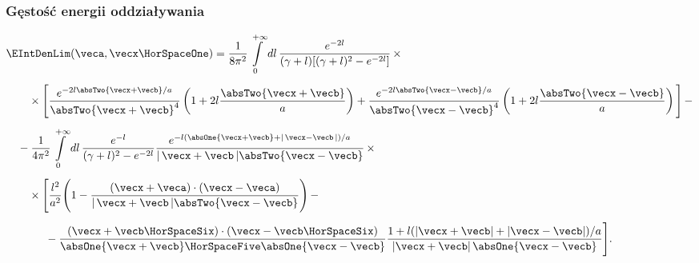 \documentclass[10pt,t]{beamer}
\begin{document}
\begin{frame}
  \frametitle{Gęstość energii oddziaływania}

  \vspace{-2em}


  \begin{equation}
    \label{eq:Pole-skalarne-ETC-11}
    \begin{split}
      &\EIntDenLim( \veca, \vecx \HorSpaceOne ) =
        \frac{ 1 }{ 8\pi^{ 2 } }
        \int\limits_{ 0 }^{ +\infty } dl \,
        \frac{ e^{ -2 l } }{ ( \gamma + l ) [ ( \gamma + l )^{ 2 } - e^{ -2 l } ] } \, \times
      \\[0.5em]
      &\hspace{2em}
        \times \Bigg[ \frac{ e^{ -2 l \absTwo{ \vecx + \vecb } / a } }{
        \absTwo{ \vecx + \vecb }^{ 4 } }
        \left( 1 + 2 l \frac{ \absTwo{ \vecx + \vecb } }{ a } \right) +
        \frac{ e^{ -2 l \absTwo{ \vecx - \vecb } / a } }{
        \absTwo{ \vecx - \vecb }^{ 4 } } \left( 1 +
        2 l \frac{ \absTwo{ \vecx - \vecb } }{ a } \right) \Bigg] \, -
      \\[0.5em]
      &\hspace{1em}
        - \frac{ 1 }{ 4 \pi^{ 2 } } \int\limits_{ 0 }^{ +\infty } dl \,
        \frac{ e^{ -l } }{ ( \gamma + l )^{ 2 } - e^{ -2 l } }
        \frac{ e^{ -l ( \absOne{ \vecx + \vecb } + |\,
        \vecx - \vecb\, | ) / a } }{ |\, \vecx + \vecb\, | \absTwo{ \vecx -
        \vecb } } \, \times \\[0.5em]
      &\hspace{2em}
        \times \Bigg[ \frac{ l^{ 2 } }{ a^{ 2 } } \Bigg( 1 - \frac{ (
        \vecx + \veca ) \cdot ( \vecx - \veca ) }{ |\, \vecx
        + \vecb\, | \absTwo{ \vecx - \vecb } } \Bigg) \, - \\[0.5em]
      &\hspace{3.5em}
        - \frac{ ( \vecx + \vecb \HorSpaceSix ) \cdot
        ( \vecx - \vecb \HorSpaceSix ) }{
        \absOne{ \vecx + \vecb } \HorSpaceFive
        \absOne{ \vecx - \vecb } }
        \frac{ 1 + l ( | \vecx
        + \vecb | + | \vecx - \vecb | ) / a }{ | \vecx +
        \vecb | \, \absOne{ \vecx - \vecb } } \Bigg].
    \end{split}
  \end{equation}

\end{frame}
\end{document}
